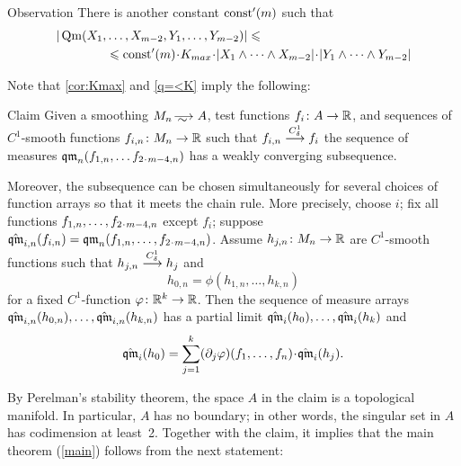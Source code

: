 \begin{thm}{Observation}\label{q=<K}
There is another constant $\mathrm{const}'(m)$ such that 
\begin{align*}
|\Qm(X_1,&\dots,X_{m-2},Y_1,\dots,Y_{m-2})|\le
\\
&\le 
\const'(m)\cdot K_{max}\cdot|X_1\wedge\dots\wedge X_{m-2}|\cdot |Y_1\wedge\dots\wedge Y_{m-2}|
\end{align*}

\end{thm}

Note that \ref{cor:Kmax} and \ref{q=<K} imply the following:

\begin{thm}{Claim}\label{clm:weak-partial-limit}
Given a smoothing $M_n\smooths{} A$,
test functions $f_i\:A\zz\to \RR$,
and sequences of $C^1$-smooth functions $f_{i,n}\colon M_n\to \mathbb{R}$ such that 
$f_{i,n}\zz\smoothto f_i$ the sequence of measures 
$\qm_n(f_{1,n},\zz\dots f_{2\cdot m-4,n})$ has a weakly converging subsequence.

Moreover, the subsequence can be chosen simultaneously for several choices of function arrays so that it meets the chain rule.
More precisely, choose $i$; fix all functions $f_{1,n},\zz\dots, f_{2\cdot m-4,n}$ except $f_i$;
suppose $\hat\qm_{i,n}(f_{i,n})=\qm_n(f_{1,n},\zz\dots, f_{2\cdot m-4,n})$.
Assume $h_{j,n}\colon M_n\to \mathbb{R}$ are $C^1$-smooth functions such that 
$h_{j,n}\zz\smoothto h_j$ and 
\[h_{0,n}=\phi(h_{1,n},\dots,h_{k,n})\]
for a fixed $C^1$-function $\varphi\colon\mathbb{R}^k\to\mathbb{R}$.
Then the sequence of measure arrays $\hat{\operatorname{\mathfrak{qm}}}_{i,n}(h_{0,n}),\dots,\hat{\operatorname{\mathfrak{qm}}}_{i,n}(h_{k,n})$
has a partial limit $\hat\qm_{i}(h_0),\zz\dots,\hat\qm_{i}(h_k)$ and
\[\hat\qm_{i}(h_0)=\sum_{j=1}^k (\partial_j\phi)(f_1,\dots,f_n)\cdot\hat\qm_{i}(h_j).\]

\end{thm}


By Perelman's stability theorem, the space $A$ in the claim is a topological manifold.
In particular, $A$ has no boundary;
in other words, the singular set in $A$ has codimension at least~2.
Together with the claim, it implies that the main theorem (\ref{main}) follows from the next statement:

